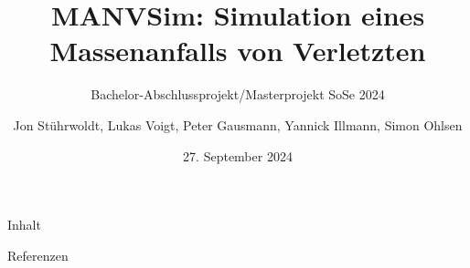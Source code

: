 \documentclass[10pt,aspectratio=169]{beamer}
\title[]{MANVSim: Simulation eines Massenanfalls von Verletzten}
\subtitle[]{Bachelor-Abschlussprojekt/Masterprojekt SoSe 2024}
\author{Jon Stührwoldt, Lukas Voigt, Peter Gausmann, Yannick Illmann, Simon Ohlsen}
\date{27. September 2024}
\begin{document}
\frame{\titlepage}

\begin{frame}{Inhalt}
	\tableofcontents[hideallsubsections]
\end{frame}








%
%

\begin{frame}{Referenzen}
	\printbibliography
\end{frame}
\end{document}
